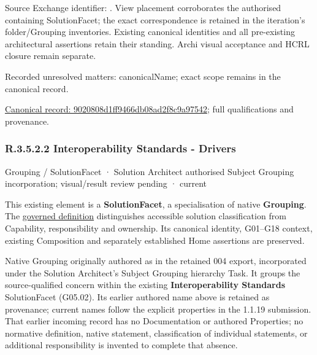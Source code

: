 Source Exchange identifier: \texttt{}. View placement corroborates
the authorised containing SolutionFacet; the exact correspondence is retained in the
iteration's folder/Grouping inventories. Existing canonical identities and all
pre-existing architectural assertions retain their standing. Archi visual
acceptance and HCRL closure remain separate.


{\small Recorded unresolved matters: canonicalName; exact scope remains in the canonical record.}\par
{\footnotesize \href{../../../../../../../continuum/grouping/9020808d1ff9466db08ad2f8c9a97542.md}{Canonical record: 9020808d1ff9466db08ad2f8c9a97542}; full qualifications and provenance.}\par
\subsubsection*{R.3.5.2.2 Interoperability Standards - Drivers}
\label{navigation:R.3.5.2.2}

\label{element:bc45121331a04af7a54e790bd4a7ea6e}
{\small Grouping / SolutionFacet · Solution Architect authorised Subject Grouping incorporation; visual/result review pending · current}\par

This existing element is a \textbf{SolutionFacet}, a specialisation of native
\textbf{Grouping}. The \href{\detokenize{../../../../../../../governance/continuum-representation.md#solutionfacet-classification--1119-candidate}}{governed definition}
distinguishes accessible solution classification from Capability, responsibility
and ownership. Its canonical identity, G01–G18 context, existing Composition
and separately established Home assertions are preserved.



Native Grouping originally authored as \texttt{} in the retained 004 export,
incorporated under the Solution Architect's Subject Grouping hierarchy Task.
It groups the source-qualified \texttt{} concern within
the existing \textbf{Interoperability Standards} SolutionFacet (G05.02). Its earlier authored name above is retained as provenance; current names
follow the explicit properties in the 1.1.19 submission.
That earlier incoming record has no Documentation or authored Properties; no normative
definition, native statement, classification of individual statements, or
additional responsibility is invented to complete that absence.




